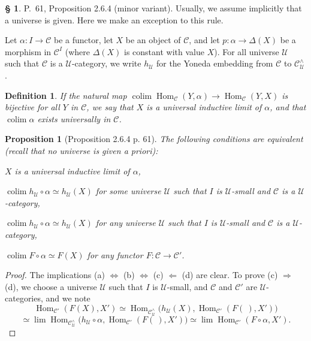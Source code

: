 \documentclass[12pt]{article}%
\newtheorem{prop}[thm]{Proposition}
\newtheorem{df}[thm]{Definition}%
\theoremstyle{remark}
\theoremstyle{definition}
\newtheorem{s}[thm]{\S}%
\newcommand{\nn}{\noindent}
\newcommand{\C}{\mathcal C}
\newcommand{\U}{\mathcal U}
\newcommand{\si}{\Leftarrow}
\newcommand{\ssi}{\Leftrightarrow}%
\newcommand{\then}{\Rightarrow}
\DeclareMathOperator*{\colim}{colim}%
\DeclareMathOperator{\Hom}{Hom}%
\begin{document}
\begin{s} 
P.~61, Proposition 2.6.4 (minor variant). Usually, we assume implicitly that a universe is given. Here we make an exception to this rule. 

Let $\alpha:I\to\C$ be a functor, let $X$ be an object of $\C$, and let $p:\alpha\to\Delta(X)$ be a morphism in $\C^I$ (where $\Delta(X)$ is constant with value $X$). For all universe $\U$ such that $\C$ is a $\U$-category, we write $h_\U$ for the Yoneda embedding from $\C$ to $\C^\wedge_\U$.

\begin{df}\label{uil}
If the natural map $\colim\Hom_\C(Y,\alpha)\to\Hom_\C(Y,X)$ is bijective for all $Y$ in $\C$, we say that $X$ is a {\em universal} inductive limit  of $\alpha$, and that $\colim\alpha$ exists {\em universally}  in $\C$.
\end{df}

\begin{prop}[Proposition 2.6.4 p. 61]\label{puil}
The following conditions are equivalent (recall that no universe is given {\em a priori}):

\nn{\em(a)} $X$ is a universal inductive limit of $\alpha$,

\nn{\em(b)} $\colim h_\U\circ\alpha\simeq h_\U(X)$ for \emph{some} universe $\U$ such that $I$ is $\U$-small and $\C$ is a $\U$-category,

\nn{\em(c)} $\colim h_\U\circ\alpha\simeq h_\U(X)$ for \emph{any} universe $\U$ such that $I$ is $\U$-small and $\C$ is a $\U$-category, 

\nn{\em(d)} $\colim F\circ\alpha\simeq F(X)$ for \emph{any} functor $F:\C\to\C'$. 
\end{prop}

\begin{proof} The implications (a) $\ssi$ (b) $\ssi$ (c) $\si$ (d) are clear. To prove (c) $\then$ (d), we choose a universe $\U$ such that $I$ is $\U$-small, and $\C$ and $\C'$ are $\U$-categories, and we note
$$
\Hom_{\C'}(F(X),X')\simeq\Hom_{\C^\wedge_\U}\big(h_\U(X),\Hom_{\C'}(F(\ ),X')\big)
$$
$$
\simeq\lim\Hom_{\C^\wedge_\U}\big(h_\U\circ\alpha,\Hom_{\C'}(F(\ ),X')\big)\simeq\lim\Hom_{\C'}(F\circ\alpha,X').
$$
\end{proof}
\end{s}

%
\end{document}
